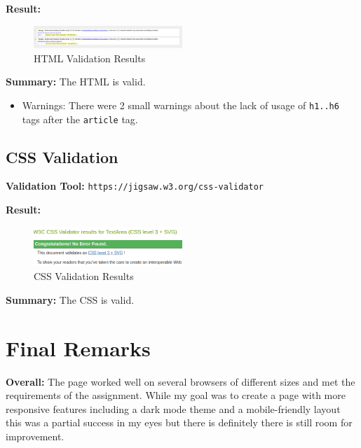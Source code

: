 \documentclass{article}
\begin{document}
\textbf{Result:}
\begin{figure}[h]
    \centering
    \includegraphics[width=0.5\textwidth]{graphics/HTML_validation.png}
    \caption{HTML Validation Results}
\end{figure}

\textbf{Summary:} The HTML is valid.
\begin{itemize}
    \item Warnings: There were 2 small warnings about the lack of usage of \texttt{h1..h6} tags after the \texttt{article} tag.
\end{itemize}

\subsection{CSS Validation}
\textbf{Validation Tool:} \texttt{https://jigsaw.w3.org/css-validator}

\textbf{Result:}
\begin{figure}[h]
    \centering
    \includegraphics[width=0.5\textwidth]{graphics/CSS_validation.png}
    \caption{CSS Validation Results}
\end{figure}

\textbf{Summary:} The CSS is valid.

\section{Final Remarks}

\textbf{Overall:} The page worked well on several browsers of different sizes and met the requirements of the assignment. 
While my goal was to create a page with more responsive features including a dark mode theme and a mobile-friendly layout 
this was a partial success in my eyes but there is definitely there is still room for improvement.
\end{document}
